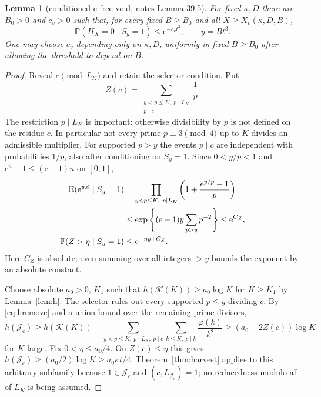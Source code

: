 \documentclass[10pt,reqno]{amsart}
\newtheorem{lemma}[theorem]{Lemma}
\theoremstyle{remark}
\newcommand{\K}{\mathcal K}
\newcommand{\J}{\mathcal J}
\newcommand{\E}{\mathbb E}
\newcommand{\Prob}{\mathbb P}
\newcommand{\e}{\mathrm e}
\begin{document}
\begin{lemma}[conditioned c-free void; notes Lemma 39.5]\label{lem:void}
For fixed $\kappa,D$ there are $B_0>0$ and $c_v>0$ such that, for every
fixed $B\geq B_0$ and all $X\geq X_v(\kappa,D,B)$,
\begin{equation}\label{eq:void}
 \Prob(H_X=0\mid S_y=1)\leq\e^{-c_vt^3},\qquad y=Bt^3.
\end{equation}
One may choose $c_v$ depending only on $\kappa,D$, uniformly in fixed
$B\geq B_0$ after allowing the threshold to depend on $B$.
\end{lemma}
\begin{proof}
Reveal $c\pmod{L_K}$ and retain the selector condition.  Put
\begin{equation}\label{eq:Z}
 Z(c)=\sum_{\substack{y<p\leq K,\ p\mid L_K\\p\mid c}}\frac1p.
\end{equation}
The restriction $p\mid L_K$ is important: otherwise divisibility by $p$
is not defined on the residue $c$.  In particular not every prime
$p\equiv3\pmod4$ up to $K$ divides an admissible multiplier.
For supported $p>y$ the events $p\mid c$ are independent with probabilities
$1/p$, also after conditioning on $S_y=1$.
Since $0<y/p<1$ and $\e^u-1\leq(\e-1)u$ on $[0,1]$,
\begin{align}
 \E(\e^{yZ}\mid S_y=1)
 &=\prod_{y<p\leq K,\ p\mid L_K}
           \left(1+\frac{\e^{y/p}-1}{p}\right)\notag\\
 &\leq\exp\left\{(\e-1)y\sum_{p>y}p^{-2}\right\}\leq\e^{C_Z},
                                                        \label{eq:Zmoment}\\
 \Prob(Z>\eta\mid S_y=1)&\leq\e^{-\eta y+C_Z}.
                                                        \label{eq:Ztail}
\end{align}
Here $C_Z$ is absolute; even summing over all integers $>y$ bounds the
exponent by an absolute constant.

Choose absolute $a_0>0$, $K_1$ such that
$h(\K(K))\geq a_0\log K$ for $K\geq K_1$ by Lemma~\ref{lem:h}.
The selector rules out every supported $p\leq y$ dividing $c$.
By \eqref{eq:hremove} and a union bound over the remaining prime divisors,
\[
 h(\J_c)\geq h(\K(K))-
       \sum_{y<p\leq K,\ p\mid L_K,\ p\mid c}
          \sum_{k\leq K,\ p\mid k}\frac{\varphi(k)}{k^2}
 \geq (a_0-2Z(c))\log K
\]
for $K$ large.  Fix $0<\eta\leq a_0/4$.  On $Z(c)\leq\eta$ this gives
$h(\J_c)\geq(a_0/2)\log K\geq a_0\kappa t/4$.
Theorem~\ref{thm:harvest} applies to this arbitrary subfamily because
$1\in\J_c$ and $(c,L_{\J_c})=1$; no reducedness modulo all of $L_K$
is being assumed.


\end{proof}
\end{document}
